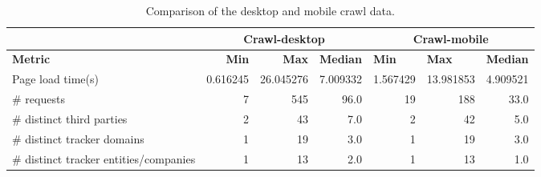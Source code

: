 \begin{table}[ht] 
\caption{Comparison of the desktop and mobile crawl data.} 
\centering 
\begin{tabular}{|l|rrl|lll|} 
\hline 
\textbf{} & \multicolumn{3}{c|}{\textbf{Crawl-desktop}} & \multicolumn{3}{c|}{\textbf{Crawl-mobile}} \\ \hline 
\textbf{Metric} & \multicolumn{1}{r|}{\textbf{Min}} & \multicolumn{1}{r|}{\textbf{Max}} & \textbf{Median} & \multicolumn{1}{l|}{\textbf{Min}} & \multicolumn{1}{l|}{\textbf{Max}} & \textbf{Median} \\ \hline 
Page load time(s) & \multicolumn{1}{r|}{0.616245} & \multicolumn{1}{r|}{26.045276} & \multicolumn{1}{r|}{7.009332} & \multicolumn{1}{r|}{1.567429} & \multicolumn{1}{r|}{13.981853} & \multicolumn{1}{r|}{4.909521} \\ \hline 
\# requests & \multicolumn{1}{r|}{7} & \multicolumn{1}{r|}{545} & \multicolumn{1}{r|}{96.0} & \multicolumn{1}{r|}{19} & \multicolumn{1}{r|}{188} & \multicolumn{1}{r|}{33.0} \\ \hline 
\# distinct third parties & \multicolumn{1}{r|}{2} & \multicolumn{1}{r|}{43} & \multicolumn{1}{r|}{7.0} & \multicolumn{1}{r|}{2} & \multicolumn{1}{r|}{42} & \multicolumn{1}{r|}{5.0} \\ \hline 
\# distinct tracker domains & \multicolumn{1}{r|}{1} & \multicolumn{1}{r|}{19} & \multicolumn{1}{r|}{3.0} & \multicolumn{1}{r|}{1} & \multicolumn{1}{r|}{19} & \multicolumn{1}{r|}{3.0} \\ \hline 
\# distinct tracker entities/companies & \multicolumn{1}{r|}{1} & \multicolumn{1}{r|}{13} & \multicolumn{1}{r|}{2.0} & \multicolumn{1}{r|}{1} & \multicolumn{1}{r|}{13} & \multicolumn{1}{r|}{1.0} \\ \hline 
\end{tabular} 
\label{table:Comparison} 
\end{table}